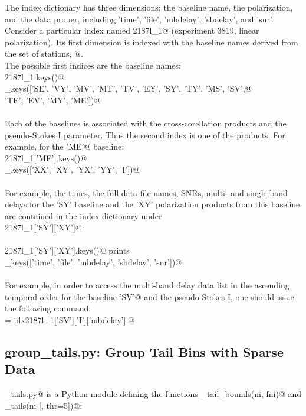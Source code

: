 \documentclass[letterpaper,twoside,12pt]{article}
\begin{document}
The index dictionary has three dimensions: the baseline name, the polarization, and the data proper, including 'time', 'file', 'mbdelay', 'sbdelay', and 'snr'. Consider a particular index named \verb@idx2187l_1@ (experiment 3819, linear polarization). Its first dimension is indexed with the baseline names derived from the set of stations, @. \\
\noindent The possible first indices are the baseline names: \\
\verb@idx2187l_1.keys()@ \\
\verb@dict_keys(['SE', 'VY', 'MV', 'MT', 'TV', 'EY', 'SY', 'TY', 'MS', 'SV',@ \\
\verb@           'TE', 'EV', 'MY', 'ME'])@ \\ \\
\noindent Each of the baselines is associated with the cross-corellation products and the pseudo-Stokes I parameter. Thus the second index is one of the products. For example, for the \verb@'ME'@ baseline: \\
\verb@idx2187l_1['ME'].keys()@ \\
\verb@dict_keys(['XX', 'XY', 'YX', 'YY', 'I'])@ \\ \\
For example, the times, the full data file names, SNRs, multi- and single-band delays for the 'SY' baseline and the 'XY' polarization products from this baseline are contained in the index dictionary under \\
\verb@idx2187l_1['SY']['XY']@: \\ \\
\verb@idx2187l_1['SY']['XY'].keys()@ prints \\
\verb@dict_keys(['time', 'file', 'mbdelay', 'sbdelay', 'snr'])@. \\ \\
For example, in order to access the multi-band delay data list in the ascending temporal order for the baseline \verb@'SV'@ and the pseudo-Stokes I, one should issue the following command: \\
\verb@mbd = idx2187l_1['SV']['I']['mbdelay'].@

\subsection{group\_tails.py: Group Tail Bins with Sparse Data}

\verb@group_tails.py@ is a Python module defining the functions \verb@find_tail_bounds(ni, fni)@ and \verb@group_tails(ni [, thr=5])@: \\
\end{document}
